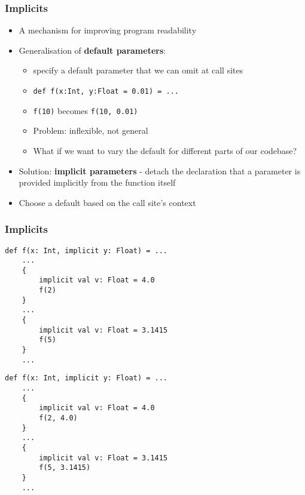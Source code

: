 \begin{frame}
    \frametitle{Implicits}
    \begin{itemize}
        \pause
        \item A mechanism for improving program readability
        \pause
        \item Generalisation of \textbf{default parameters}:
        \begin{itemize}
            \pause
            \item specify a default parameter that we can omit at call sites
            \pause
            \item \texttt{def f(x:Int, y:Float = 0.01) = ...}
            \pause
            \item \texttt{f(10)} becomes \texttt{f(10, 0.01)}
            \pause
            \item Problem: inflexible, not general
            \pause
            \item What if we want to vary the default for different parts of our
                codebase?
        \end{itemize}
        \pause
        \item Solution: \textbf{implicit parameters} - detach the declaration
            that a parameter is provided implicitly from the function itself
        \item Choose a default based on the call site's context
    \end{itemize}
\end{frame}

\begin{frame}[fragile]
    \frametitle{Implicits}
    \pause
    \begin{overprint}
        \begin{lstlisting}[mathescape]
    def f(x: Int, implicit y: Float) = ...
    ...
    {
        implicit val v: Float = 4.0
        f(2)
    }
    ...
    {
        implicit val v: Float = 3.1415
        f(5)
    }
    ...
        \end{lstlisting}
        \begin{lstlisting}[mathescape]
    def f(x: Int, implicit y: Float) = ...
    ...
    {
        implicit val v: Float = 4.0
        f(2, 4.0)
    }
    ...
    {
        implicit val v: Float = 3.1415
        f(5, 3.1415)
    }
    ...
        \end{lstlisting}
    \end{overprint}
\end{frame}

